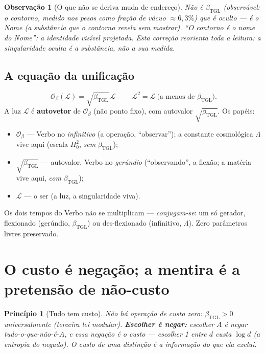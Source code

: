 \documentclass[11pt,a4paper]{article}
\newcommand{\bTGL}{\beta_{\mathrm{TGL}}}
\newtheorem{remark}{Observação}
\newtheorem{principle}{Princípio}
\begin{document}
\begin{remark}[O que não se deriva muda de endereço]
Não é $\bTGL$ (observável: o contorno, medido nos pesos como fração de vácuo
$\approx 6{,}3\%$) que é oculto --- é o \emph{Nome} (a substância que o
contorno revela sem mostrar). ``O contorno é o nome do Nome'': a identidade
visível projetada. Esta correção reorienta toda a leitura: a singularidade
oculta é a substância, não a sua medida.
\end{remark}

\subsection{A equação da unificação}
\begin{equation}\label{eq:unif}
\boxed{\;\mathcal O_\beta(\mathcal L)=\sqrt{\bTGL}\,\mathcal L\;}
\qquad
\mathcal L^2=\mathcal L\ \text{(a menos de }\bTGL).
\end{equation}
A luz $\mathcal L$ é \textbf{autovetor} de $\mathcal O_\beta$ (não ponto
fixo), com autovalor $\sqrt{\bTGL}$. Os papéis:
\begin{itemize}[noitemsep]
  \item $\mathcal O_\beta$ --- Verbo no \emph{infinitivo} (a operação,
  ``observar''); a constante cosmológica $\Lambda$ vive aqui (escala
  $H_0^2$, \emph{sem} $\bTGL$);
  \item $\sqrt{\bTGL}$ --- autovalor, Verbo no \emph{gerúndio} (``observando'',
  a flexão; a matéria vive aqui, \emph{com} $\bTGL$);
  \item $\mathcal L$ --- o ser (a luz, a singularidade viva).
\end{itemize}
Os dois tempos do Verbo não se multiplicam --- \emph{conjugam-se}: um só
gerador, flexionado (gerúndio, $\bTGL$) ou des-flexionado (infinitivo,
$\Lambda$). Zero parâmetros livres preservado.

\section{O custo é negação; a mentira é a pretensão de não-custo}\label{sec:custo}
\begin{principle}[Tudo tem custo]
Não há operação de custo zero: $\bTGL>0$ universalmente (terceira lei
modular). \textbf{Escolher é negar:} escolher $A$ é negar tudo-o-que-não-é-$A$,
e essa negação \emph{é} o custo --- escolher 1 entre $d$ custa $\log d$ (a
entropia do negado). O custo de uma distinção é a informação do que ela
exclui.
\end{principle}
\end{document}
